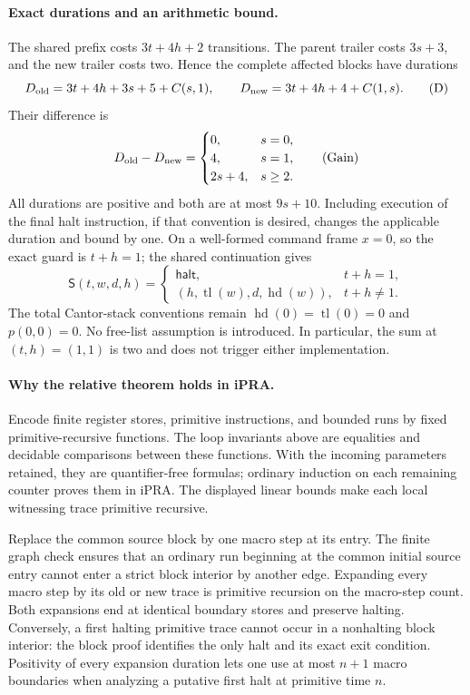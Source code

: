 \paragraph{Exact durations and an arithmetic bound.}
The shared prefix costs $3t+4h+2$ transitions. The parent trailer costs
$3s+3$, and the new trailer costs two. Hence the complete affected blocks
have durations
\[
 D_{\rm old}=3t+4h+3s+5+C(s,1),\qquad
 D_{\rm new}=3t+4h+4+C(1,s).                                  \tag{D}
\]
Their difference is
\[
 D_{\rm old}-D_{\rm new}=
 \begin{cases}
 0,&s=0,\\
 4,&s=1,\\
 2s+4,&s\geq2.
 \end{cases}                                                   \tag{Gain}
\]
All durations are positive and both are at most $9s+10$. Including
execution of the final halt instruction, if that convention is desired,
changes the applicable duration and bound by one. On a well-formed command
frame $x=0$, so the exact guard is $t+h=1$; the shared continuation gives
\[
 \mathsf S(t,w,d,h)=
 \begin{cases}
 \mathsf{halt},&t+h=1,\\
 (h,\operatorname{tl}(w),d,\operatorname{hd}(w)),&t+h\ne1.
 \end{cases}
\]
The total Cantor-stack conventions remain
$\operatorname{hd}(0)=\operatorname{tl}(0)=0$ and $p(0,0)=0$.
No free-list assumption is introduced. In particular, the sum at
$(t,h)=(1,1)$ is two and does not trigger either implementation.

\paragraph{Why the relative theorem holds in iPRA.}
Encode finite register stores, primitive instructions, and bounded runs
by fixed primitive-recursive functions. The loop invariants above are
equalities and decidable comparisons between these functions. With the
incoming parameters retained, they are quantifier-free formulas; ordinary
induction on each remaining counter proves them in iPRA. The displayed
linear bounds make each local witnessing trace primitive recursive.

Replace the common source block by one macro step at its entry. The
finite graph check ensures that an ordinary run beginning at the common
initial source entry cannot enter a strict block interior by another
edge. Expanding every macro step by its old or new trace is primitive
recursion on the macro-step count. Both expansions end at identical
boundary stores and preserve halting. Conversely, a first halting
primitive trace cannot occur in a nonhalting block interior: the block
proof identifies the only halt and its exact exit condition. Positivity
of every expansion duration lets one use at most $n+1$ macro boundaries
when analyzing a putative first halt at primitive time $n$.

